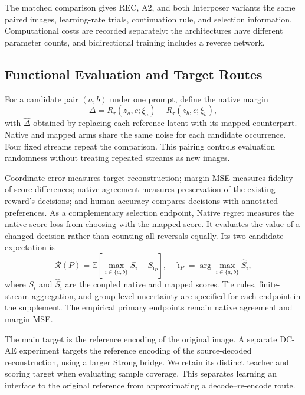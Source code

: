 \documentclass[10pt,twocolumn,letterpaper]{article}
\newcommand{\E}{\mathbb E}
\begin{document}
The matched comparison gives REC, A2, and both Interposer variants the same paired images, learning-rate trials, continuation rule, and selection information. Computational costs are recorded separately: the architectures have different parameter counts, and bidirectional training includes a reverse network.

\subsection{Functional Evaluation and Target Routes}
For a candidate pair $(a,b)$ under one prompt, define the native margin
\begin{equation}
 \Delta=R_\tau(z_a,c;\xi_a)-R_\tau(z_b,c;\xi_b),
\end{equation}
with $\widehat\Delta$ obtained by replacing each reference latent with its mapped counterpart. Native and mapped arms share the same noise for each candidate occurrence. Four fixed streams repeat the comparison. This pairing controls evaluation randomness without treating repeated streams as new images.

Coordinate error measures target reconstruction; margin MSE measures fidelity of score differences; native agreement measures preservation of the existing reward's decisions; and human accuracy compares decisions with annotated preferences. As a complementary selection endpoint, Native regret measures the native-score loss from choosing with the mapped score. It evaluates the value of a changed decision rather than counting all reversals equally. Its two-candidate expectation is
\begin{equation}
 \mathcal R(P)=\E\!\left[\max_{i\in\{a,b\}}S_i-S_{\hat\imath_P}\right],
 \quad \hat\imath_P=\arg\max_{i\in\{a,b\}}\widehat S_i,
 \label{eq:regret}
\end{equation}
where $S_i$ and $\widehat S_i$ are the coupled native and mapped scores. Tie rules, finite-stream aggregation, and group-level uncertainty are specified for each endpoint in the supplement. The empirical primary endpoints remain native agreement and margin MSE.

The main target is the reference encoding of the original image. A separate DC-AE experiment targets the reference encoding of the source-decoded reconstruction, using a larger Strong bridge. We retain its distinct teacher and scoring target when evaluating sample coverage. This separates learning an interface to the original reference from approximating a decode--re-encode route.
\end{document}
